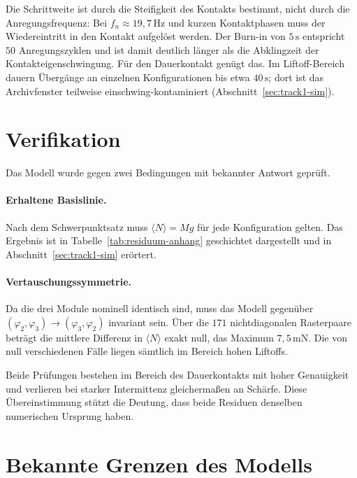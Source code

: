 \documentclass[12pt,a4paper]{report}
\begin{document}
Die Schrittweite ist durch die Steifigkeit des Kontakts bestimmt, nicht
durch die Anregungsfrequenz: Bei $f_n \approx 19{,}7\,\mathrm{Hz}$ und
kurzen Kontaktphasen muss der Wiedereintritt in den Kontakt aufgelöst
werden. Der Burn-in von $5\,\mathrm{s}$ entspricht $50$ Anregungszyklen
und ist damit deutlich länger als die Abklingzeit der
Kontakteigenschwingung. Für den Dauerkontakt genügt das. Im
Liftoff-Bereich dauern Übergänge an einzelnen Konfigurationen bis etwa
$40\,\mathrm{s}$; dort ist das Archivfenster teilweise
einschwing-kontaminiert (Abschnitt~\ref{sec:track1-sim}).

\section{Verifikation}

Das Modell wurde gegen zwei Bedingungen mit bekannter Antwort geprüft.

\paragraph{Erhaltene Basislinie.}
Nach dem Schwerpunktsatz muss $\langle N \rangle = Mg$ für jede
Konfiguration gelten. Das Ergebnis ist in
Tabelle~\ref{tab:residuum-anhang} geschichtet dargestellt und in
Abschnitt~\ref{sec:track1-sim} erörtert.

\paragraph{Vertauschungssymmetrie.}
Da die drei Module nominell identisch sind, muss das Modell gegenüber
$(\varphi_2, \varphi_3) \rightarrow (\varphi_3, \varphi_2)$ invariant
sein. Über die $171$ nichtdiagonalen Rasterpaare beträgt die mittlere
Differenz in $\langle N \rangle$ exakt null, das Maximum
$7{,}5\,\mathrm{mN}$. Die von null verschiedenen Fälle liegen
sämtlich im Bereich hohen Liftoffs.

Beide Prüfungen bestehen im Bereich des Dauerkontakts mit hoher
Genauigkeit und verlieren bei starker Intermittenz gleichermaßen an
Schärfe. Diese Übereinstimmung stützt die Deutung, dass beide Residuen
denselben numerischen Ursprung haben.

\section{Bekannte Grenzen des Modells}
\end{document}
